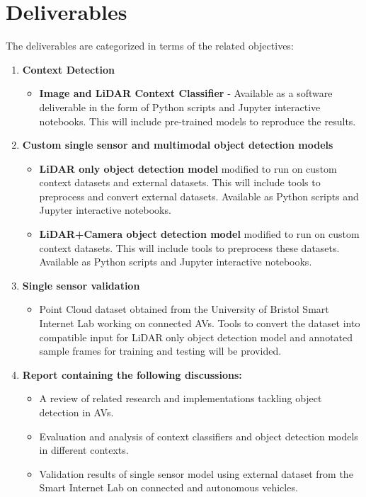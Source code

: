 \section{Deliverables}

The deliverables are categorized in terms of the related objectives: 
\begin{enumerate}
	\item \textbf{Context Detection}
	\begin{itemize}
		 \item \textbf{Image and LiDAR Context Classifier} - Available as a software deliverable in the form of Python scripts and Jupyter interactive notebooks. This will include pre-trained models to reproduce the results. 
	\end{itemize}
	\item \textbf{Custom single sensor and multimodal object detection models}
	\begin{itemize}
		\item \textbf{LiDAR only object detection model} modified to run on custom context datasets and external datasets. This will include tools to preprocess and convert external datasets. Available as Python scripts and Jupyter interactive notebooks.
		\item \textbf{LiDAR+Camera object detection model} modified to run on custom context datasets. This will include tools to preprocess these datasets. Available as Python scripts and Jupyter interactive notebooks.
		
	\end{itemize}
	\item \textbf{Single sensor validation}
	\begin{itemize}
		\item Point Cloud dataset obtained from the University of Bristol Smart Internet Lab working on connected AVs. Tools to convert the dataset into compatible input for LiDAR only object detection model and annotated sample frames for training and testing will be provided.
	\end{itemize}
	\item \textbf{Report containing the following discussions:}
	\begin{itemize}
		\item A review of related research and implementations tackling object detection in AVs. 
		\item Evaluation and analysis of context classifiers and object detection models in different contexts. 
		\item Validation results of single sensor model using external dataset from the Smart Internet Lab on connected and autonomous vehicles.
	\end{itemize}
\end{enumerate}

